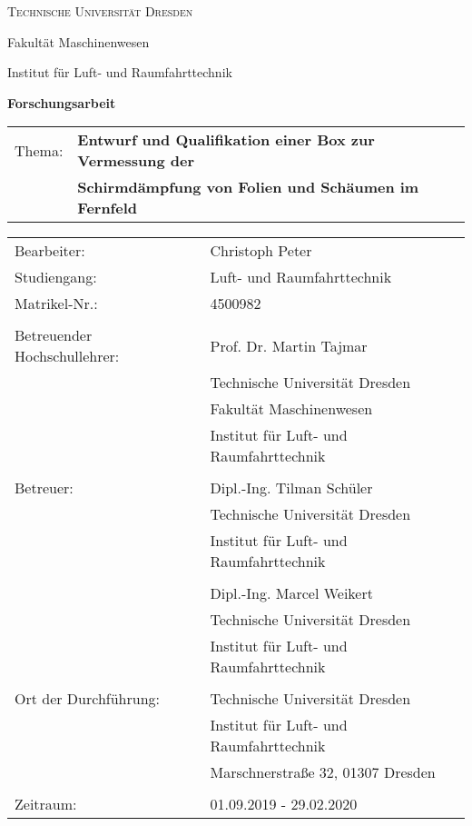 \begin{titlepage}

\noindent \begin{center}
{\scshape\LARGE Technische Universität Dresden \par}
Fakultät Maschinenwesen \par
Institut für Luft- und Raumfahrttechnik
\par\end{center}

\noindent \vspace{1cm}


\noindent \begin{center}
\textbf{\huge Forschungsarbeit} \vspace{2cm}
\par\end{center}{\Large \par}

\begin{tabular}{p{2.5cm} l}
\renewcommand{\arraystretch}{1}
    \Large Thema: & \Large \textbf{Entwurf und Qualifikation einer Box zur Vermessung der} \\
     & \Large \textbf{Schirmdämpfung von Folien und Schäumen im Fernfeld}
\end{tabular}

\vspace{1cm}

\begin{tabular}{p{6cm} l}
\renewcommand{\arraystretch}{1}
Bearbeiter: & Christoph Peter\\
Studiengang: & Luft- und Raumfahrttechnik \\
Matrikel-Nr.: & 4500982 \\
 & \\
Betreuender Hochschullehrer: & Prof. Dr. Martin Tajmar\\
 & Technische Universität Dresden \\
 & Fakultät Maschinenwesen \\
 & Institut für Luft- und Raumfahrttechnik\\
 & \\
 Betreuer: & Dipl.-Ing. Tilman Schüler \\
 & Technische Universität Dresden \\
 & Institut für Luft- und Raumfahrttechnik  \\
 &          \\
 & Dipl.-Ing. Marcel Weikert \\
 & Technische Universität Dresden \\
 & Institut für Luft- und Raumfahrttechnik \\
 & \\
Ort der Durchführung: & Technische Universität Dresden \\
 & Institut für Luft- und Raumfahrttechnik \\
 & Marschnerstraße 32, 01307 Dresden \\
 & \\
 Zeitraum: & 01.09.2019 - 29.02.2020

\end{tabular}

\end{titlepage}
